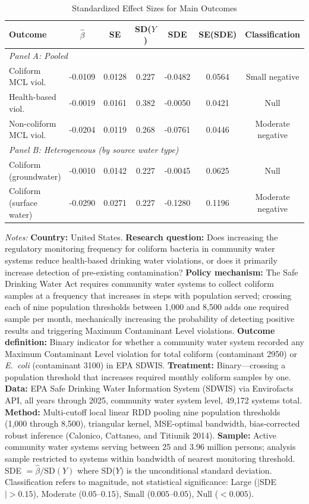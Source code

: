\begin{table}[H]
\centering
\caption{Standardized Effect Sizes for Main Outcomes}
\label{tab:sde}
\begin{threeparttable}
\small
\begin{tabular}{lcccccc}
\toprule
Outcome & $\hat{\beta}$ & SE & SD($Y$) & SDE & SE(SDE) & Classification \\
\midrule
\multicolumn{7}{l}{\textit{Panel A: Pooled}} \\
Coliform MCL viol. & -0.0109 & 0.0128 & 0.227 & -0.0482 & 0.0564 & Small negative \\
Health-based viol. & -0.0019 & 0.0161 & 0.382 & -0.0050 & 0.0421 & Null \\
Non-coliform MCL viol. & -0.0204 & 0.0119 & 0.268 & -0.0761 & 0.0446 & Moderate negative \\
\midrule
\multicolumn{7}{l}{\textit{Panel B: Heterogeneous (by source water type)}} \\
Coliform (groundwater) & -0.0010 & 0.0142 & 0.227 & -0.0045 & 0.0625 & Null \\
Coliform (surface water) & -0.0290 & 0.0271 & 0.227 & -0.1280 & 0.1196 & Moderate negative \\
\bottomrule
\end{tabular}
\begin{tablenotes}[flushleft]
\small
\item \textit{Notes:} \textbf{Country:} United States. \textbf{Research question:} Does increasing the regulatory monitoring frequency for coliform bacteria in community water systems reduce health-based drinking water violations, or does it primarily increase detection of pre-existing contamination? \textbf{Policy mechanism:} The Safe Drinking Water Act requires community water systems to collect coliform samples at a frequency that increases in steps with population served; crossing each of nine population thresholds between 1,000 and 8,500 adds one required sample per month, mechanically increasing the probability of detecting positive results and triggering Maximum Contaminant Level violations. \textbf{Outcome definition:} Binary indicator for whether a community water system recorded any Maximum Contaminant Level violation for total coliform (contaminant 2950) or \textit{E.~coli} (contaminant 3100) in EPA SDWIS. \textbf{Treatment:} Binary---crossing a population threshold that increases required monthly coliform samples by one. \textbf{Data:} EPA Safe Drinking Water Information System (SDWIS) via Envirofacts API, all years through 2025, community water system level, 49,172 systems total. \textbf{Method:} Multi-cutoff local linear RDD pooling nine population thresholds (1,000 through 8,500), triangular kernel, MSE-optimal bandwidth, bias-corrected robust inference (Calonico, Cattaneo, and Titiunik 2014). \textbf{Sample:} Active community water systems serving between 25 and 3.96 million persons; analysis sample restricted to systems within bandwidth of nearest monitoring threshold. SDE $= \hat{\beta} / \text{SD}(Y)$ where SD($Y$) is the unconditional standard deviation. Classification refers to magnitude, not statistical significance: Large ($|$SDE$| > 0.15$), Moderate ($0.05$--$0.15$), Small ($0.005$--$0.05$), Null ($< 0.005$).

\end{tablenotes}
\end{threeparttable}
\end{table}
